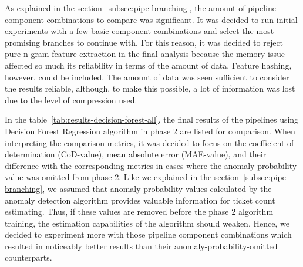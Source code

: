 As explained in the section~\ref{subsec:pipe-branching},
the amount of pipeline component combinations to compare was significant.
It was decided to run initial experiments with a few basic component combinations
and select the most promising branches to continue with.
For this reason,
it was decided to reject pure n-gram feature extraction in the final analysis
because the memory issue affected so much its reliability in terms of the amount of data.
Feature hashing, however,
could be included.
The amount of data was seen sufficient to consider the results reliable,
although, to make this possible,
a lot of information was lost due to the level of compression used.

In the table~\ref{tab:results-decision-forest-all},
the final results of the pipelines using Decision Forest Regression algorithm in phase 2
are listed for comparison.
When interpreting the comparison metrics,
it was decided to focus on the coefficient of determination (CoD-value),
mean absolute error (MAE-value),
and their difference with the corresponding metrics
in cases where the anomaly probability value was omitted from phase 2.
Like we explained in the section~\ref{subsec:pipe-branching},
we assumed that anomaly probability values calculated by the anomaly detection algorithm
provides valuable information for ticket count estimating.
Thus,
if these values are removed before the phase 2 algorithm training,
the estimation capabilities of the algorithm should weaken.
Hence,
we decided to experiment more with those pipeline component combinations
which resulted in noticeably better results
than their anomaly-probability-omitted counterparts.


